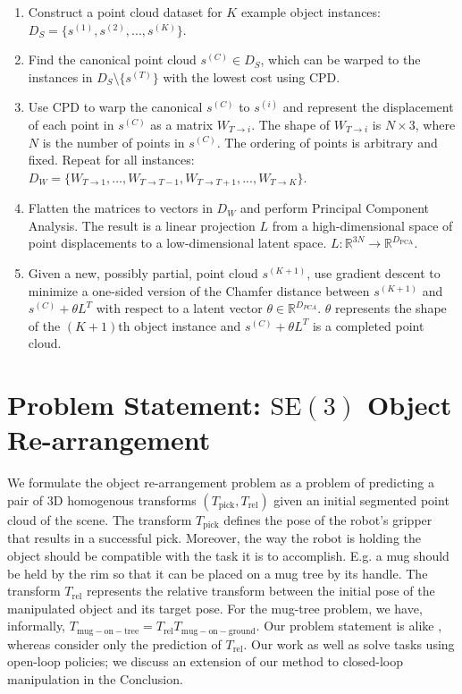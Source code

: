 \documentclass{article}
\begin{document}
\begin{enumerate}
    \item Construct a point cloud dataset for $K$ example object instances: $D_S = \{ s^{(1)}, s^{(2)}, ..., s^{(K)} \}$.
    \item Find the canonical point cloud $s^{(C)} \in D_S$, which can be warped to the instances in $D_S \setminus \{s^{(T)}\}$ with the lowest cost using CPD.
    \item Use CPD to warp the canonical $s^{(C)}$ to $s^{(i)}$ and represent the displacement of each point in $s^{(C)}$ as a matrix $W_{T \rightarrow i}$. The shape of $W_{T \rightarrow i}$ is $N{\times}3$, where $N$ is the number of points in $s^{(C)}$. The ordering of points is arbitrary and fixed. Repeat for all instances: $D_W = \{ W_{T \rightarrow 1}, ..., W_{T \rightarrow T - 1}, W_{T \rightarrow T + 1}, ..., W_{T \rightarrow K} \}$.
    \item Flatten the matrices to vectors in $D_W$ and perform Principal Component Analysis. The result is a linear projection $L$ from a high-dimensional space of point displacements to a low-dimensional latent space. $L: \mathbb{R}^{3N} \rightarrow \mathbb{R}^{D_{\mathrm{PCA}}}$.
    \item Given a new, possibly partial, point cloud $s^{(K+1)}$, use gradient descent to minimize a one-sided version of the Chamfer distance \cite{fan17point} between $s^{(K+1)}$ and $s^{(C)} + \theta L^T$ with respect to a latent vector $\theta \in \mathbb{R}^{D_{PCA}}$. $\theta$ represents the shape of the $(K+1)$th object instance and $s^{(C)} + \theta L^T$ is a completed point cloud.
\end{enumerate}

\section{Problem Statement: $\mathrm{SE(3)}$ Object Re-arrangement}

We formulate the object re-arrangement problem as a problem of predicting a pair of 3D homogenous transforms $(T_\mathrm{pick}, T_\mathrm{rel})$ given an initial segmented point cloud of the scene. The transform $T_\mathrm{pick}$ defines the pose of the robot's gripper that results in a successful pick. Moreover, the way the robot is holding the object should be compatible with the task it is to accomplish. E.g. a mug should be held by the rim so that it can be placed on a mug tree by its handle. The transform $T_\mathrm{rel}$ represents the relative transform between the initial pose of the manipulated object and its target pose. For the mug-tree problem, we have, informally, $T_{\mathrm{mug-on-tree}} = T_\mathrm{rel} T_{\mathrm{mug-on-ground}}$. Our problem statement is alike \cite{simeonov22Neurala,simeonov22SE}, whereas \cite{pan22TAXPose} consider only the prediction of $T_\mathrm{rel}$. Our work as well as \cite{simeonov22Neurala,simeonov22SE,pan22TAXPose} solve tasks using open-loop policies; we discuss an extension of our method to closed-loop manipulation in the Conclusion.
\end{document}
